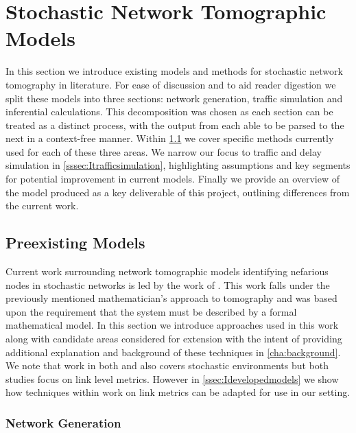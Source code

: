 \newpage

\section{Stochastic Network Tomographic Models}
\label{sec:Imodels}

In this section we introduce existing models and methods for stochastic network tomography in literature. For ease of discussion and to aid reader digestion we split these models into three sections: network generation, traffic simulation and inferential calculations. This decomposition was chosen as each section can be treated as a distinct process, with the output from each able to be parsed to the next in a context-free manner. Within \cref{ssec:Icurrentmodels} we cover specific methods currently used for each of these three areas. We narrow our focus to traffic and delay simulation in \cref{sssec:Itrafficsimulation}, highlighting assumptions and key segments for potential improvement in current models. Finally we provide an overview of the model produced as a key deliverable of this project, outlining differences from the current work.

\subsection{Preexisting Models}
\label{ssec:Icurrentmodels}

Current work surrounding network tomographic models identifying nefarious nodes in stochastic networks is led by the work of \cite{barnes_stochastic_2020}. This work falls under the previously mentioned mathematician's approach to tomography and was based upon the requirement that the system must be described by a formal mathematical model. In this section we introduce approaches used in this work along with candidate areas considered for extension with the intent of providing additional explanation and background of these techniques in \cref{cha:background}. We note that work in both \cite{he_fisher_2015} and \cite{kolar_distributed_2020} also covers stochastic environments but both studies focus on link level metrics. However in \cref{ssec:Idevelopedmodels} we show how techniques within work on link metrics can be adapted for use in our setting.

\subsubsection*{Network Generation}
\label{sssec:Inetworkgeneration}

